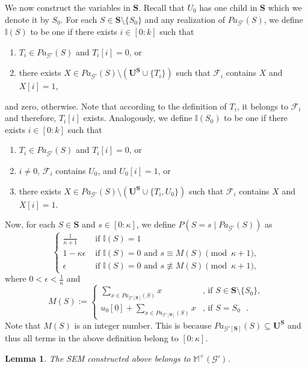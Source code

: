 \documentclass[accepted]{uai2022}
\newtheorem{lemma}{Lemma}
\newcommand{\Pa}[2]{\textit{Pa}_{#2}(#1)}
\newcommand{\U}[0]{\mathbf{U}}
\newcommand{\G}[0]{\mathcal{G}}
\newcommand{\F}[0]{\mathcal{F}}
\begin{document}
    We now construct the variables in $\mathbf{S}$. 
    Recall that $U_0$ has one child in $\mathbf{S}$ which we denote it by $S_0$.
    For each $S \in \mathbf{S}\setminus \{S_0\}$ and any realization of $\Pa{S}{\G'}$, we define $\mathds{I}(S)$ to be one if there exists $i\in [0:k]$ such that
    \begin{enumerate}
        \item $T_i \in \Pa{S}{\G'}$ and $T_i[i]=0$, or
        \item there exists $X \in \Pa{S}{\G'} \setminus (\U^{\mathbf{S}}\cup \{T_i\})$ such that $\F_i$ contains $X$ and $X[i]=1$,
    \end{enumerate}
    and zero, otherwise.
    Note that according to the definition of $T_i$, it belongs to $\mathcal{F}_i$ and therefore, $T_i[i]$ exists. 
    Analogously, we define $\mathds{I}(S_0)$ to be one if there exists $i\in [0:k]$ such that
    \begin{enumerate}
        \item $T_i \in \Pa{S}{\G'}$ and $T_i[i]=0$, or
        \item $i\neq0$, $\mathcal{F}_i$ contains $U_0$, and $U_0[i]=1$, or
        \item there exists $X \in \Pa{S}{\G'} \setminus (\U^{\mathbf{S}}\cup \{T_i,U_0\})$ such that $\F_i$ contains $X$ and $X[i]=1$.
    \end{enumerate}
    
    Now, for each $S\in \mathbf{S}$ and $s \in [0:\kappa]$, we define $P(S=s \mid \Pa{S}{\G'})$ as
    \begin{equation*}
    \begin{cases} 
        \frac{1}{\kappa+1} & \text{ if } \mathds{I}(S)=1\\
        1-\kappa\epsilon &  \text{ if } \mathds{I}(S)=0  \text{ and } s \equiv M(S) \pmod{\kappa+1}, \\
        \epsilon &  \text{ if }  \mathds{I}(S)=0  \text{ and } s\not\equiv M(S) \pmod{\kappa+1},
    \end{cases}
    \end{equation*}
    where $0<\epsilon<\frac{1}{\kappa}$ and 
    \begin{equation*}
    M(S):=
    \begin{cases} 
        \sum_{x\in \Pa{S}{\G'[\mathbf{S}]}}x & \text{, if } S\in \mathbf{S}\setminus \{S_0\}, \\
        u_0[0]+\sum_{x\in \Pa{S}{\G'[\mathbf{S}]}}x & \text{, if $S=S_0$ }.
    \end{cases}
    \end{equation*}
    Note that $M(S)$ is an integer number. This is because $\Pa{S}{\G'[\mathbf{S}]}\subseteq \U^{\mathbf{S}}$ and thus all terms in the above definition belong to $[0:\kappa]$. 
    \begin{lemma} \label{lemma: valid model}
        The SEM constructed above belongs to $\mathbb{M}^+(\G')$. 
    \end{lemma}
\end{document}
